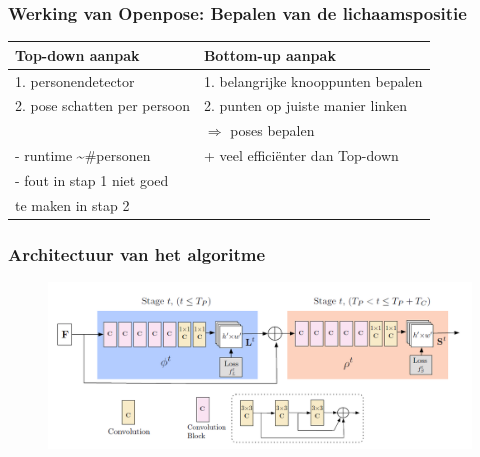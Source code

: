 \documentclass
   [kulak] %
   {kulakbeamer}
\begin{document}
\begin{frame}
\frametitle{Werking van Openpose: Bepalen van de lichaamspositie}

\begin{center}
	\begin{tabular}{l|l} 
		\textbf{Top-down aanpak} & \textbf{Bottom-up aanpak}\\
		\hline
		1. personendetector & 1. belangrijke knooppunten bepalen\\
		2. pose schatten per persoon & 2. punten op juiste manier linken\\
		& $\Rightarrow$ poses bepalen\\
		\hline
		- runtime \textasciitilde \#personen  & + veel efficiënter dan Top-down\\
		- fout in stap 1 niet goed  & \\
		 te maken in stap 2 & \\
	\end{tabular}
\end{center}
\end{frame}

\begin{frame}
\frametitle{Architectuur van het algoritme}
	\begin{figure}
		\centering
		\includegraphics[width=\textwidth]{algoritme_architectuur}
	\end{figure}
\end{frame}
\end{document}
